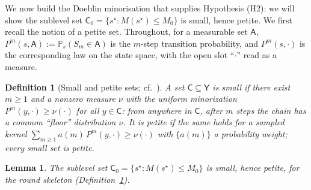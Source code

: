 \documentclass[11pt]{article}
\newtheorem{lem}{Lemma}
\newtheorem{dfn}{Definition}
\theoremstyle{definition}
\begin{document}
We now build the Doeblin minorisation that supplies Hypothesis (H2): we will show the sublevel set $\mathsf{C}_0 = \{s^{\star} : M(s^{\star}) \leq M_0\}$ is small, hence petite. We first recall the notion of a petite set. Throughout, for a measurable set $\mathsf{A}$, $P^m(s, \mathsf{A}) := \mathbb{P}_s(S_m \in \mathsf{A})$ is the $m$-step transition probability, and $P^m(s, \cdot)$ is the corresponding law on the state space, with the open slot ``$\cdot$'' read as a measure.

\begin{dfn}[Small and petite sets; cf.\ {\cite[\S5.2, \S5.5]{MeynTweedie2009}}]
\label{dfn:petite}
A set $\mathsf{C} \subseteq \mathsf{Y}$ is \emph{small} if there exist $m \geq 1$ and a nonzero measure $\nu$ with the uniform minorization $P^m(y, \cdot) \geq \nu(\cdot)$ for all $y \in \mathsf{C}$: from anywhere in $\mathsf{C}$, after $m$ steps the chain has a common ``floor'' distribution $\nu$. It is \emph{petite} if the same holds for a sampled kernel $\sum_{m \geq 1} a(m)\,P^m(y, \cdot) \geq \nu(\cdot)$ with $\{a(m)\}$ a probability weight; every small set is petite.
\end{dfn}










\begin{lem}
\label{lem:doeblin}
The sublevel set $\mathsf{C}_0 = \{s^{\star} : M(s^{\star}) \leq M_0\}$ is small, hence petite, for the round skeleton (Definition~\ref{dfn:petite}).
\end{lem}
\end{document}
